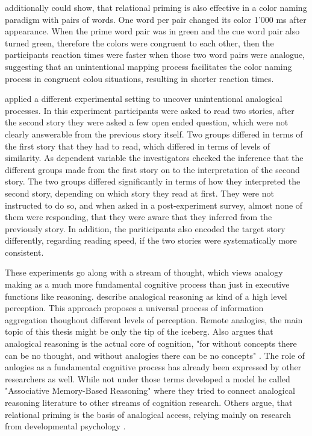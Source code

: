 \documentclass[a4paper,man,natbib,floatsintext,import]{apa6}
\begin{document}
\cite{Hristova2009b} additionally could show, that relational priming is also effective in a color naming paradigm with pairs of words. One word per pair changed its color 1'000 ms after appearance. When the prime word pair was in green and the cue word pair also turned green, therefore the colors were congruent to each other, then the participants reaction times were faster when those two word pairs were analogue, suggesting that an unintentional mapping process facilitates the color naming process in congruent colou situations, resulting in shorter reaction times.

\cite{Day2007} applied a different experimental setting to uncover unintentional analogical processes. In this experiment participants were asked to read two stories, after the second story they were asked a few open ended question, which were not clearly answerable from the previous story itself. Two groups differed in terms of the first story that they had to read, which differed in terms of levels of similarity. As dependent variable the investigators checked the inference that the different groups made from the first story on to the interpretation of the second story. The two groups differed significantly in terms of how they interpreted the second story, depending on which story they read at first. They were not instructed to do so, and when asked in a post-experiment survey, almost none of them were responding, that they were aware that they inferred from the previously story. In addition, the pariticipants also encoded the target story differently, regarding reading speed, if the two stories were systematically more consistent.

These experiments go along with a stream of thought, which views analogy making as a much more fundamental cognitive process than just in executive functions like reasoning. \cite{Chalmers1992} describe analogical reasoning as kind of a high level perception. This approach proposes a universal process of information aggregation thoughout different levels of perception. Remote analogies, the main topic of this thesis might be only the tip of the iceberg. Also \cite{Hofstadter2001} argues that analogical reasoning is the actual core of cognition, "for without concepts there can be no thought, and without analogies there can be no concepts" \citep[p. 34]{Hofstadter2013}. The role of anlogies as a fundamental cognitive process has already been expressed by other researchers as well. While not under those terms \cite{Kokinov1994} developed a model he called "Associative Memory-Based Reasoning" where they tried to connect analogical reasoning literature to other streams of cognition research. Others argue, that relational priming is the basis of analogical access, relying mainly on research from developmental psychology \citep{Leech2008}.
\end{document}
